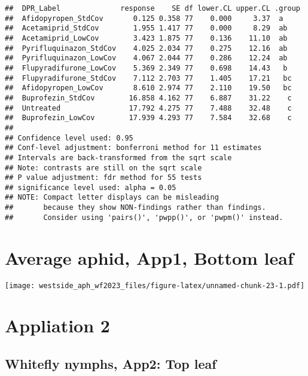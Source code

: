 \documentclass[
]{article}
\begin{document}
\begin{verbatim}
##  DPR_Label              response    SE df lower.CL upper.CL .group
##  Afidopyropen_StdCov       0.125 0.358 77    0.000     3.37  a    
##  Acetamiprid_StdCov        1.955 1.417 77    0.000     8.29  ab   
##  Acetamiprid_LowCov        3.423 1.875 77    0.136    11.10  ab   
##  Pyrifluquinazon_StdCov    4.025 2.034 77    0.275    12.16  ab   
##  Pyrifluquinazon_LowCov    4.067 2.044 77    0.286    12.24  ab   
##  Flupyradifurone_LowCov    5.369 2.349 77    0.698    14.43   b   
##  Flupyradifurone_StdCov    7.112 2.703 77    1.405    17.21   bc  
##  Afidopyropen_LowCov       8.610 2.974 77    2.110    19.50   bc  
##  Buprofezin_StdCov        16.858 4.162 77    6.887    31.22    c  
##  Untreated                17.792 4.275 77    7.488    32.48    c  
##  Buprofezin_LowCov        17.939 4.293 77    7.584    32.68    c  
## 
## Confidence level used: 0.95 
## Conf-level adjustment: bonferroni method for 11 estimates 
## Intervals are back-transformed from the sqrt scale 
## Note: contrasts are still on the sqrt scale 
## P value adjustment: fdr method for 55 tests 
## significance level used: alpha = 0.05 
## NOTE: Compact letter displays can be misleading
##       because they show NON-findings rather than findings.
##       Consider using 'pairs()', 'pwpp()', or 'pwpm()' instead.
\end{verbatim}

\hypertarget{average-aphid-app1-bottom-leaf}{%
\section{Average aphid, App1, Bottom
leaf}\label{average-aphid-app1-bottom-leaf}}

\texttt{[image: westside\_aph\_wf2023\_files/figure-latex/unnamed-chunk-23-1.pdf]}

\hypertarget{appliation-2}{%
\section{Appliation 2}\label{appliation-2}}

\hypertarget{whitefly-nymphs-app2-top-leaf}{%
\subsection{Whitefly nymphs, App2: Top
leaf}\label{whitefly-nymphs-app2-top-leaf}}
\end{document}
